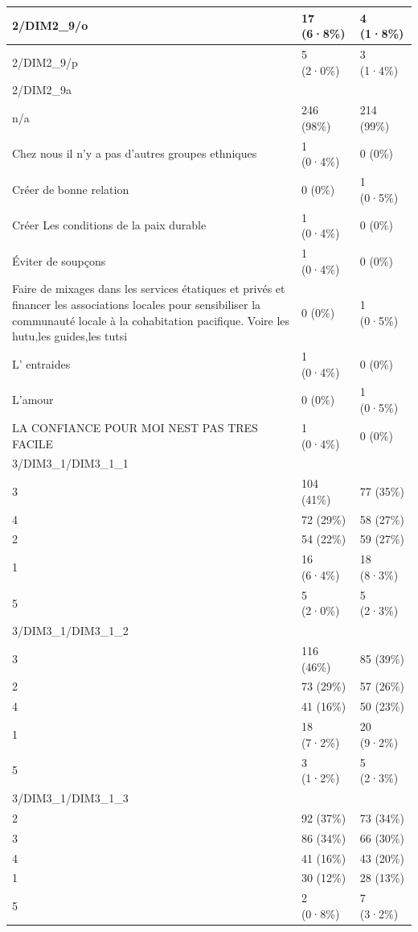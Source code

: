 \documentclass[
]{book}
\begin{document}
\begin{tabular}{l|l|l}
\hline
2/DIM2\_9/o & 17 (6·8\%) & 4 (1·8\%)\\
\hline
2/DIM2\_9/p & 5 (2·0\%) & 3 (1·4\%)\\
\hline
2/DIM2\_9a &  & \\
\hline
n/a & 246 (98\%) & 214 (99\%)\\
\hline
Chez nous il n'y a pas d'autres groupes ethniques & 1 (0·4\%) & 0 (0\%)\\
\hline
Créer de bonne relation & 0 (0\%) & 1 (0·5\%)\\
\hline
Créer Les conditions de la paix durable & 1 (0·4\%) & 0 (0\%)\\
\hline
Éviter de soupçons & 1 (0·4\%) & 0 (0\%)\\
\hline
Faire de mixages dans les services étatiques et privés et financer les associations locales pour sensibiliser la communauté locale à la cohabitation pacifique. Voire les hutu,les guides,les tutsi & 0 (0\%) & 1 (0·5\%)\\
\hline
L' entraides & 1 (0·4\%) & 0 (0\%)\\
\hline
L'amour & 0 (0\%) & 1 (0·5\%)\\
\hline
LA CONFIANCE POUR MOI NEST PAS TRES FACILE & 1 (0·4\%) & 0 (0\%)\\
\hline
3/DIM3\_1/DIM3\_1\_1 &  & \\
\hline
3 & 104 (41\%) & 77 (35\%)\\
\hline
4 & 72 (29\%) & 58 (27\%)\\
\hline
2 & 54 (22\%) & 59 (27\%)\\
\hline
1 & 16 (6·4\%) & 18 (8·3\%)\\
\hline
5 & 5 (2·0\%) & 5 (2·3\%)\\
\hline
3/DIM3\_1/DIM3\_1\_2 &  & \\
\hline
3 & 116 (46\%) & 85 (39\%)\\
\hline
2 & 73 (29\%) & 57 (26\%)\\
\hline
4 & 41 (16\%) & 50 (23\%)\\
\hline
1 & 18 (7·2\%) & 20 (9·2\%)\\
\hline
5 & 3 (1·2\%) & 5 (2·3\%)\\
\hline
3/DIM3\_1/DIM3\_1\_3 &  & \\
\hline
2 & 92 (37\%) & 73 (34\%)\\
\hline
3 & 86 (34\%) & 66 (30\%)\\
\hline
4 & 41 (16\%) & 43 (20\%)\\
\hline
1 & 30 (12\%) & 28 (13\%)\\
\hline
5 & 2 (0·8\%) & 7 (3·2\%)\\

\end{tabular}
\end{document}
